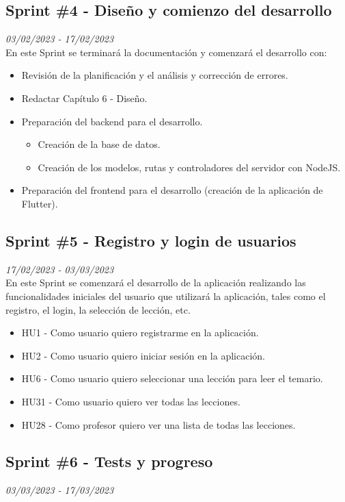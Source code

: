 \subsection{Sprint \#4 - Diseño y comienzo del desarrollo}
\textit{03/02/2023   -   17/02/2023}\\

En este Sprint se terminará la documentación y comenzará el desarrollo con:
\begin{itemize}
    \item Revisión de la planificación y el análisis y corrección de errores.
    \item Redactar Capítulo 6 - Diseño.
    \item Preparación del backend para el desarrollo.
          \begin{itemize}
              \item Creación de la base de datos.
              \item Creación de los modelos, rutas y controladores del servidor con NodeJS.
          \end{itemize}
    \item Preparación del frontend para el desarrollo (creación de la aplicación de Flutter).
\end{itemize}

\subsection{Sprint \#5 - Registro y login de usuarios}
\textit{17/02/2023   -   03/03/2023}\\

En este Sprint se comenzará el desarrollo de la aplicación realizando las funcionalidades iniciales del usuario
que utilizará la aplicación, tales como el registro, el login, la selección de lección, etc.
\begin{itemize}
    \item HU1 - Como usuario quiero registrarme en la aplicación.
    \item HU2 - Como usuario quiero iniciar sesión en la aplicación.
    \item HU6 - Como usuario quiero seleccionar una lección para leer el temario.
    \item HU31 - Como usuario quiero ver todas las lecciones.
    \item HU28 - Como profesor quiero ver una lista de todas las lecciones.
\end{itemize}


\subsection{Sprint \#6 - Tests y progreso}
\textit{03/03/2023   -   17/03/2023}\\

